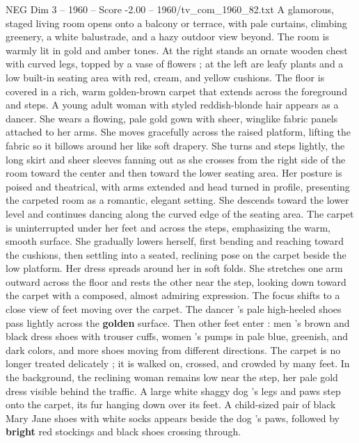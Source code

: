 \begin{textsample}{NEG Dim 3 – 1960 – Score -2.00 – 1960/tv\_com\_1960\_82.txt}  \label{ex:f3_neg_075}
A glamorous, staged living room opens onto a balcony or terrace, with pale curtains, climbing greenery, a white balustrade, and a hazy outdoor view beyond.
The room is warmly lit in gold and amber tones.
At the right stands an ornate wooden chest with curved legs, topped by a vase of flowers ; at the left are leafy plants and a low built-in seating area with red, cream, and yellow cushions.
The floor is covered in a rich, warm golden-brown carpet that extends across the foreground and steps.
A young adult woman with styled reddish-blonde hair appears as a dancer.
She wears a flowing, pale gold gown with sheer, winglike fabric panels attached to her arms.
She moves gracefully across the raised platform, lifting the fabric so it billows around her like soft drapery.
She turns and steps lightly, the long skirt and sheer sleeves fanning out as she crosses from the right side of the room toward the center and then toward the lower seating area.
Her posture is poised and theatrical, with arms extended and head turned in profile, presenting the carpeted room as a romantic, elegant setting.
She descends toward the lower level and continues dancing along the curved edge of the seating area.
The carpet is uninterrupted under her feet and across the steps, emphasizing the warm, smooth surface.
She gradually lowers herself, first bending and reaching toward the cushions, then settling into a seated, reclining pose on the carpet beside the low platform.
Her dress spreads around her in soft folds.
She stretches one arm outward across the floor and rests the other near the step, looking down toward the carpet with a composed, almost admiring expression.
The focus shifts to a close view of feet moving over the carpet.
The dancer ’s pale high-heeled shoes pass lightly across the \textbf{golden} surface.
Then other feet enter : men ’s brown and black dress shoes with trouser cuffs, women ’s pumps in pale blue, greenish, and dark colors, and more shoes moving from different directions.
The carpet is no longer treated delicately ; it is walked on, crossed, and crowded by many feet.
In the background, the reclining woman remains low near the step, her pale gold dress visible behind the traffic.
A large white shaggy dog ’s legs and paws step onto the carpet, its fur hanging down over its feet.
A child-sized pair of black Mary Jane shoes with white socks appears beside the dog ’s paws, followed by \textbf{bright} red stockings and black shoes crossing through.

\end{textsample}
